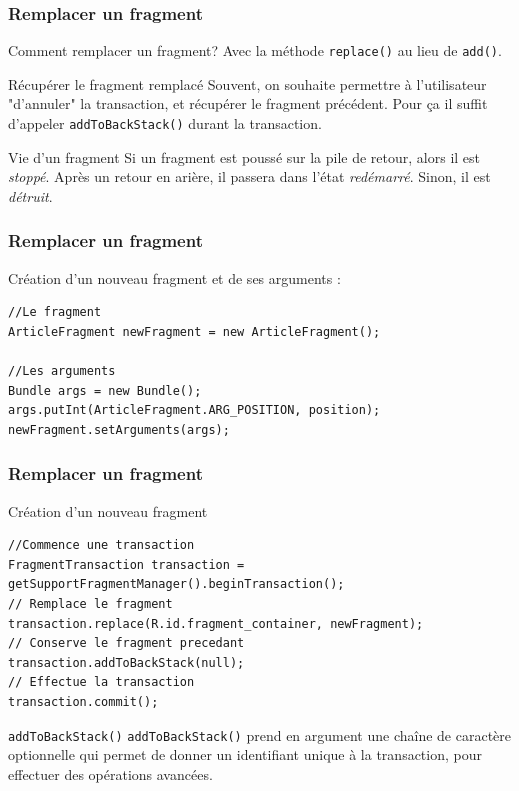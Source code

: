 \documentclass{beamer}
\begin{document}
\begin{frame}
\frametitle{Remplacer un fragment}

\begin{block}{Comment remplacer un fragment?}
Avec la méthode \verb!replace()! au lieu de \verb!add()!.
\end{block}
\pause
\begin{block}{Récupérer le fragment remplacé}
Souvent, on souhaite permettre à l'utilisateur "d'annuler"
la transaction, et récupérer le fragment précédent.
Pour ça il suffit d’appeler \verb!addToBackStack()! durant
la transaction.
\end{block}
\pause
\begin{block}{Vie d'un fragment}
Si un fragment est poussé sur la pile de retour, alors il est \emph{stoppé}. Après un retour en arière, il passera dans l'état \emph{redémarré}. Sinon, il est \emph{détruit}.
\end{block}

\end{frame}

\begin{frame}[fragile]
\frametitle{Remplacer un fragment}

\begin{exampleblock}{Création d'un nouveau fragment et de ses arguments :}
\begin{lstlisting}
//Le fragment
ArticleFragment newFragment = new ArticleFragment();

//Les arguments
Bundle args = new Bundle();
args.putInt(ArticleFragment.ARG_POSITION, position);
newFragment.setArguments(args);
\end{lstlisting}
\end{exampleblock}

\end{frame}
\begin{frame}[fragile]
\frametitle{Remplacer un fragment}

\begin{exampleblock}{Création d'un nouveau fragment}
\begin{lstlisting}
//Commence une transaction
FragmentTransaction transaction = getSupportFragmentManager().beginTransaction();
// Remplace le fragment
transaction.replace(R.id.fragment_container, newFragment);
// Conserve le fragment precedant
transaction.addToBackStack(null);
// Effectue la transaction
transaction.commit();
\end{lstlisting}
\end{exampleblock}


\begin{block}{\verb!addToBackStack()!}
\verb!addToBackStack()! prend en argument une chaîne de caractère optionnelle qui permet de donner un identifiant unique à la transaction, pour effectuer des opérations avancées.
\end{block}

\end{frame}
\end{document}
